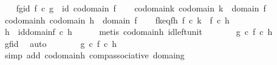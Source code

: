 \begin{isabellebody}
\ \ \isamarkupfalse%
\ fg{\isacharunderscore}{\kern0pt}id{\isacharcolon}{\kern0pt}\ {\isachardoublequoteopen}f\ {\isasymcirc}\isactrlsub c\ g\ {\isacharequal}{\kern0pt}\ id\ {\isacharparenleft}{\kern0pt}codomain\ f{\isacharparenright}{\kern0pt}{\isachardoublequoteclose}\isanewline
\ \ \isamarkupfalse%
\ codomain{\isacharunderscore}{\kern0pt}k{\isacharcolon}{\kern0pt}\ {\isachardoublequoteopen}codomain\ k\ {\isacharequal}{\kern0pt}\ domain\ f{\isachardoublequoteclose}\isanewline
\ \ \isamarkupfalse%
\ codomain{\isacharunderscore}{\kern0pt}h{\isacharcolon}{\kern0pt}\ {\isachardoublequoteopen}codomain\ h\ {\isacharequal}{\kern0pt}\ domain\ f{\isachardoublequoteclose}\isanewline
\ \ \isamarkupfalse%
\ fk{\isacharunderscore}{\kern0pt}eq{\isacharunderscore}{\kern0pt}fh{\isacharcolon}{\kern0pt}\ {\isachardoublequoteopen}f\ {\isasymcirc}\isactrlsub c\ k\ {\isacharequal}{\kern0pt}\ f\ {\isasymcirc}\isactrlsub c\ h{\isachardoublequoteclose}\isanewline
\isanewline
\ \ \isamarkupfalse%
\ {\isachardoublequoteopen}h\ {\isacharequal}{\kern0pt}\ id{\isacharparenleft}{\kern0pt}domain{\isacharparenleft}{\kern0pt}f{\isacharparenright}{\kern0pt}{\isacharparenright}{\kern0pt}\ {\isasymcirc}\isactrlsub c\ h{\isachardoublequoteclose}\isanewline
\ \ \ \ \isamarkupfalse%
\ {\isacharparenleft}{\kern0pt}metis\ codomain{\isacharunderscore}{\kern0pt}h\ id{\isacharunderscore}{\kern0pt}left{\isacharunderscore}{\kern0pt}unit{\isacharparenright}{\kern0pt}\isanewline
\ \ \isamarkupfalse%
\ \isamarkupfalse%
\ {\isachardoublequoteopen}{\isachardot}{\kern0pt}{\isachardot}{\kern0pt}{\isachardot}{\kern0pt}\ {\isacharequal}{\kern0pt}\ {\isacharparenleft}{\kern0pt}g\ {\isasymcirc}\isactrlsub c\ f{\isacharparenright}{\kern0pt}\ {\isasymcirc}\isactrlsub c\ h{\isachardoublequoteclose}\isanewline
\ \ \ \ \isamarkupfalse%
\ gf{\isacharunderscore}{\kern0pt}id\ \isamarkupfalse%
\ auto\isanewline
\ \ \isamarkupfalse%
\ \isamarkupfalse%
\ {\isachardoublequoteopen}{\isachardot}{\kern0pt}{\isachardot}{\kern0pt}{\isachardot}{\kern0pt}\ {\isacharequal}{\kern0pt}\ g\ {\isasymcirc}\isactrlsub c\ {\isacharparenleft}{\kern0pt}f\ {\isasymcirc}\isactrlsub c\ h{\isacharparenright}{\kern0pt}{\isachardoublequoteclose}\isanewline
\ \ \ \ \isamarkupfalse%
\ {\isacharparenleft}{\kern0pt}simp\ add{\isacharcolon}{\kern0pt}\ codomain{\isacharunderscore}{\kern0pt}h\ comp{\isacharunderscore}{\kern0pt}associative\ domain{\isacharunderscore}{\kern0pt}g{\isacharparenright}{\kern0pt}\isanewline

\end{isabellebody}
